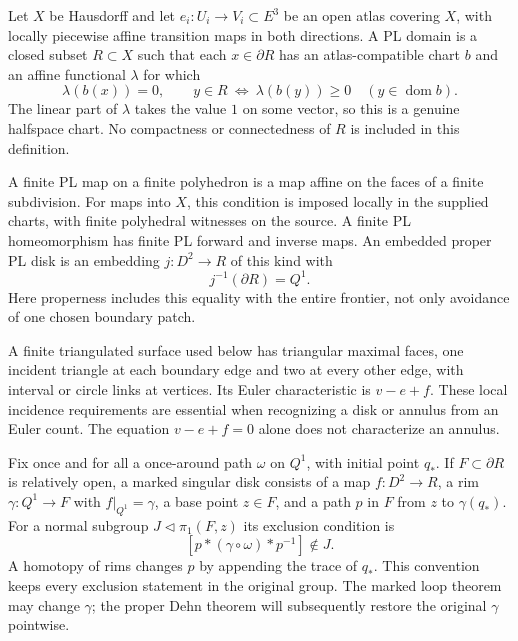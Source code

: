 \begin{definition}
\label{def:dehn-pl-domain}
Let $X$ be Hausdorff and let $e_i:U_i\to V_i\subset E^3$ be an open
atlas covering $X$, with locally piecewise affine transition maps in
both directions.  A PL domain is a closed subset $R\subset X$ such
that each $x\in\partial R$ has an atlas-compatible chart $b$ and an
affine functional $\lambda$ for which
\[
 \lambda(b(x))=0,\qquad
 y\in R\ \Longleftrightarrow\ \lambda(b(y))\geq0
 \quad(y\in\operatorname{dom}b).
\]
The linear part of $\lambda$ takes the value $1$ on some vector, so
this is a genuine halfspace chart.  No compactness or connectedness of
$R$ is included in this definition.

A finite PL map on a finite polyhedron is a map affine on the faces of
a finite subdivision.  For maps into $X$, this condition is imposed
locally in the supplied charts, with finite polyhedral witnesses on
the source.  A finite PL homeomorphism has finite PL forward and inverse
maps.  An embedded proper PL disk is an embedding $j:D^2\to R$ of this
kind with
\[
             j^{-1}(\partial R)=Q^1.
\]
Here properness includes this equality with the entire frontier, not
only avoidance of one chosen boundary patch.
\end{definition}

A finite triangulated surface used below has triangular maximal faces,
one incident triangle at each boundary edge and two at every other
edge, with interval or circle links at vertices.  Its Euler
characteristic is $v-e+f$.  These local incidence requirements are
essential when recognizing a disk or annulus from an Euler count.
The equation $v-e+f=0$ alone does not characterize an annulus.

Fix once and for all a once-around path $\omega$ on $Q^1$, with initial
point $q_*$.  If $F\subset\partial R$ is relatively open, a marked
singular disk consists of a map $f:D^2\to R$, a rim
$\gamma:Q^1\to F$ with $f|_{Q^1}=\gamma$, a base point $z\in F$,
and a path $p$ in $F$ from $z$ to $\gamma(q_*)$.  For a normal subgroup
$J\triangleleft\pi_1(F,z)$ its exclusion condition is
\[
            [p*(\gamma\circ\omega)*p^{-1}]\notin J.
\]
A homotopy of rims changes $p$ by appending the trace of $q_*$.
This convention keeps every exclusion statement in the original group.
The marked loop theorem may change $\gamma$; the proper Dehn theorem
will subsequently restore the original $\gamma$ pointwise.

